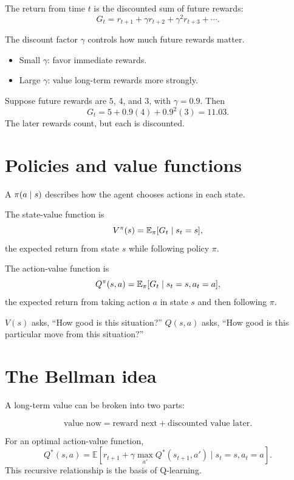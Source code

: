 The return from time $t$ is the discounted sum of future rewards:
\[
  G_t=r_{t+1}+\gamma r_{t+2}+\gamma^2r_{t+3}+\cdots.
\]

The discount factor $\gamma$ controls how much future rewards matter.

\begin{itemize}
  \item Small $\gamma$: favor immediate rewards.
  \item Large $\gamma$: value long-term rewards more strongly.
\end{itemize}

\begin{workedexample}
Suppose future rewards are $5$, $4$, and $3$, with $\gamma=0.9$. Then
\[
G_t=5+0.9(4)+0.9^2(3)=11.03.
\]
The later rewards count, but each is discounted.
\end{workedexample}

\section{Policies and value functions}

A  $\pi(a\mathrel{|} s)$ describes how the agent chooses actions in each state.

The state-value function is
\[
  V^{\pi}(s)=\mathbb{E}_{\pi}[G_t\mathrel{|} s_t=s],
\]
the expected return from state $s$ while following policy $\pi$.

The action-value function is
\[
  Q^{\pi}(s,a)=\mathbb{E}_{\pi}[G_t\mathrel{|} s_t=s,a_t=a],
\]
the expected return from taking action $a$ in state $s$ and then following $\pi$.

\begin{intuition}
$V(s)$ asks, ``How good is this situation?'' $Q(s,a)$ asks, ``How good is this particular move from this situation?''
\end{intuition}

\section{The Bellman idea}

A long-term value can be broken into two parts:

\[
\text{value now}=\text{reward next}+\text{discounted value later}.
\]

For an optimal action-value function,
\[
Q^*(s,a)=\mathbb{E}\left[r_{t+1}+\gamma\max_{a'}Q^*(s_{t+1},a')\mid s_t=s,a_t=a\right].
\]
This recursive relationship is the basis of Q-learning.

